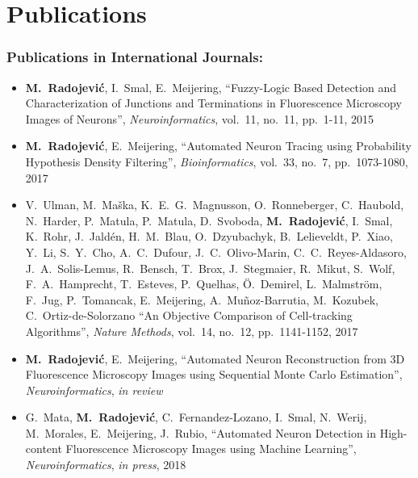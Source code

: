 %
%

\noquote
\orgchpos
\chapter*{Publications}
\label{publications}

\small
\normalsize

\subsection*{Publications in International Journals:}
\vspace{1ex}
\begin{itemize}
	\item \textbf{M.~Radojevi\'{c}}, I.~Smal, E.~Meijering, ``Fuzzy-Logic Based Detection and Characterization of Junctions and Terminations in Fluorescence Microscopy Images of Neurons'', \emph{Neuroinformatics}, vol.~11, no.~11, pp.~1-11, 2015
	
	\item \textbf{M.~Radojevi\'{c}}, E.~Meijering, ``Automated Neuron Tracing using Probability Hypothesis Density Filtering'', \emph{Bioinformatics}, vol.~33, no.~7, pp.~1073-1080, 2017
	
	\item V.~Ulman, M.~Ma\v{s}ka, K.~E.~G.~Magnusson, O.~Ronneberger, C.~Haubold, N.~Harder, P.~Matula, P.~Matula, D.~Svoboda, \textbf{M.~Radojevi\'{c}}, I.~Smal, K.~Rohr, J.~Jald\'{e}n, H.~M.~Blau, O.~Dzyubachyk, B.~Lelieveldt, P.~Xiao, Y.~Li, S.~Y.~Cho, A.~C.~Dufour,	J.~C.~Olivo-Marin, C.~C.~Reyes-Aldasoro, J.~A.~Solis-Lemus, R.~Bensch, T.~Brox, J.~Stegmaier, R.~Mikut, S.~Wolf,	F.~A.~Hamprecht, T.~Esteves, P.~Quelhas, \"{O}.~Demirel, L.~Malmstr\"{o}m, F.~Jug, P.~Tomancak, E.~Meijering, A.~Mu\~{n}oz-Barrutia, M.~Kozubek, C.~Ortiz-de-Solorzano ``An Objective Comparison of Cell-tracking Algorithms'', \emph{Nature Methods}, vol.~14, no.~12, pp.~1141-1152, 2017
	
	\item \textbf{M.~Radojevi\'{c}}, E.~Meijering, ``Automated Neuron Reconstruction from 3D Fluorescence Microscopy Images using Sequential Monte Carlo Estimation'', \emph{Neuroinformatics}, \emph{in review}%
	
	\item G.~Mata, \textbf{M.~Radojevi\'{c}}, C.~Fernandez-Lozano, I.~Smal, N.~Werij, M.~Morales, E.~Meijering, J.~Rubio, ``Automated Neuron Detection in High-content Fluorescence Microscopy Images using Machine Learning'', \emph{Neuroinformatics}, \emph{in press}, 2018%
\end{itemize}


